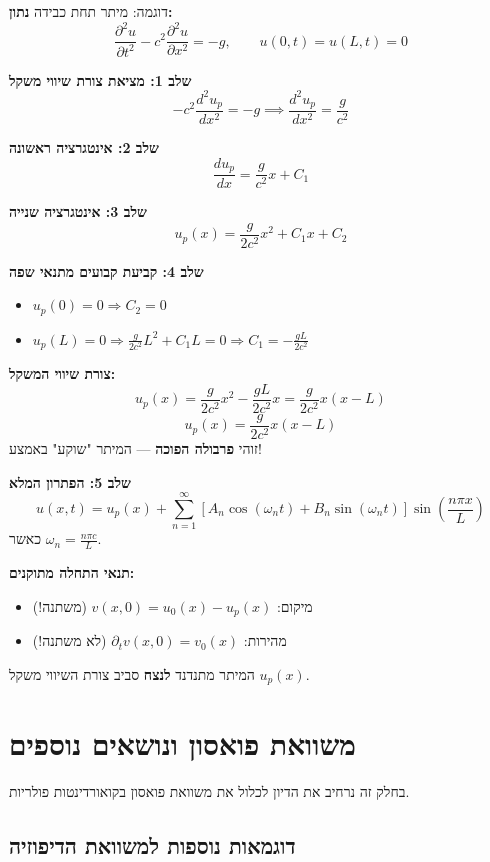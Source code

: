 \begin{examplebox}{דוגמה: מיתר תחת כבידה}
\textbf{נתון:}
\[
\frac{\partial^2 u}{\partial t^2} - c^2\frac{\partial^2 u}{\partial x^2} = -g, \qquad u(0,t)=u(L,t)=0
\]

\textbf{שלב 1: מציאת צורת שיווי משקל}
\[
-c^2\frac{d^2 u_p}{dx^2} = -g \implies \frac{d^2 u_p}{dx^2} = \frac{g}{c^2}
\]

\textbf{שלב 2: אינטגרציה ראשונה}
\[
\frac{du_p}{dx} = \frac{g}{c^2}x + C_1
\]

\textbf{שלב 3: אינטגרציה שנייה}
\[
u_p(x) = \frac{g}{2c^2}x^2 + C_1 x + C_2
\]

\textbf{שלב 4: קביעת קבועים מתנאי שפה}
\begin{itemize}
    \item $u_p(0) = 0 \Rightarrow C_2 = 0$
    \item $u_p(L) = 0 \Rightarrow \frac{g}{2c^2}L^2 + C_1 L = 0 \Rightarrow C_1 = -\frac{gL}{2c^2}$
\end{itemize}

\textbf{צורת שיווי המשקל:}
\[
u_p(x) = \frac{g}{2c^2}x^2 - \frac{gL}{2c^2}x = \frac{g}{2c^2}x(x-L)
\]
\[
\boxed{u_p(x) = \frac{g}{2c^2}x(x-L)}
\]
זוהי \textbf{פרבולה הפוכה} — המיתר "שוקע" באמצע!

\textbf{שלב 5: הפתרון המלא}
\[
u(x,t) = u_p(x) + \sum_{n=1}^\infty \left[A_n\cos(\omega_n t) + B_n\sin(\omega_n t)\right]\sin\!\left(\frac{n\pi x}{L}\right)
\]
כאשר $\omega_n = \frac{n\pi c}{L}$.

\textbf{תנאי התחלה מתוקנים:}
\begin{itemize}
    \item מיקום: $v(x,0) = u_0(x) - u_p(x)$ (משתנה!)
    \item מהירות: $\partial_t v(x,0) = v_0(x)$ (לא משתנה!)
\end{itemize}

המיתר מתנדנד \textbf{לנצח} סביב צורת השיווי משקל $u_p(x)$.
\end{examplebox}



\newpage
\section{משוואת פואסון ונושאים נוספים}

בחלק זה נרחיב את הדיון לכלול את משוואת פואסון בקואורדינטות פולריות.

\subsection{דוגמאות נוספות למשוואת הדיפוזיה}

